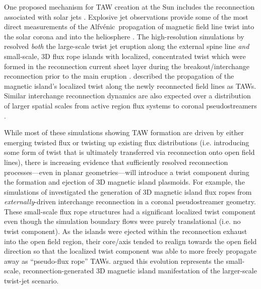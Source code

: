 \documentclass[preprint]{aastex62}
\newcommand{\Alfvenic}{Alfv\'{e}nic\ }
\begin{document}
One proposed mechanism for TAW creation at the Sun includes the reconnection 
associated with solar jets \citep{Shibata1986}. Explosive jet observations 
provide some of the most direct measurements of the \Alfvenic propagation 
of magnetic field line twist into the solar corona and into the heliosphere 
\citep[see][and references therein]{Raouafi2016, Uritsky2017}. The high-resolution 
simulations by \citet{Wyper2016b} resolved \emph{both} the large-scale 
twist jet eruption along the external spine line \emph{and} small-scale, 3D flux rope islands with localized, concentrated twist which were formed
in the reconnection current sheet layer during the breakout/interchange
reconnection prior to the main eruption \citep[see
also][]{Lynch2014,Wyper2017}. \citet{Wyper2016b} described the
propagation of the magnetic island's localized twist along the newly
reconnected field lines as TAWs.
%
Similar interchange reconnection dynamics are also expected over a 
distribution of larger spatial scales from active region flux systems \citep{Torok2009,Archontis2013,MorenoInsertis2013,Lynch2014} to
coronal pseudostreamers \citep{Torok2011, Zuccarello2012a, Masson2014,
Edmondson2017, WangYM2018}. 

While most of these simulations showing TAW formation are driven by either emerging twisted
flux or twisting up existing flux distributions (i.e. introducing
some form of twist that is ultimately transferred via reconnection
onto open field lines), there is increasing evidence that sufficiently
resolved reconnection processes---even in planar geometries---will
introduce a twist component during the formation and ejection of
3D magnetic island plasmoids. 
%
For example, the simulations of \citet{Edmondson2017} investigated 
the generation of 3D magnetic island flux ropes from \emph{externally}-driven 
interchange reconnection in a coronal pseudostreamer geometry.
%
These small-scale flux rope structures had a significant localized twist 
component even though the simulation boundary flows were purely 
translational (i.e. no twist component). 
%
As the islands were ejected within the reconnection exhaust into the open 
field region, their core/axis tended to realign {towards the} open field 
direction so that the localized twist component was able to more freely 
propagate away as ``pseudo-flux rope'' TAWs.
%
\citet{Edmondson2017} argued this evolution represents the small-scale, 
reconnection-generated 3D magnetic island manifestation of the larger-scale 
\citet{Shibata1986} twist-jet scenario.
\end{document}
